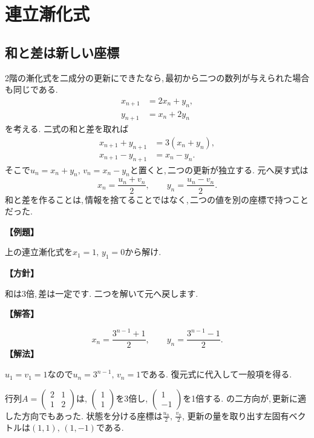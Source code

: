\section{連立漸化式}\label{節：連立漸化式}
\subsection{和と差は新しい座標}

2階の漸化式を二成分の更新にできたなら,\,最初から二つの数列が与えられた場合も同じである.
\[
 \begin{aligned}
 x_{n+1}&=2x_n+y_n,\\
 y_{n+1}&=x_n+2y_n
 \end{aligned}
\]
を考える. 二式の和と差を取れば
\[
 \begin{aligned}
 x_{n+1}+y_{n+1}&=3(x_n+y_n),\\
 x_{n+1}-y_{n+1}&=x_n-y_n.
 \end{aligned}
\]
そこで$u_n=x_n+y_n,\,v_n=x_n-y_n$と置くと,\,二つの更新が独立する.
元へ戻す式は
\[
 x_n=\frac{u_n+v_n}{2},\qquad
 y_n=\frac{u_n-v_n}{2}.
\]
和と差を作ることは,\,情報を捨てることではなく,\,二つの値を別の座標で持つことだった.

\noindent\textbf{【例題】}\par\nobreak
上の連立漸化式を$x_1=1,\,y_1=0$から解け.

\noindent\textbf{【方針】}\par\nobreak
和は3倍,\,差は一定です. 二つを解いて元へ戻します.

\noindent\textbf{【解答】}\par\nobreak
\[
 x_n=\frac{3^{n-1}+1}{2},\qquad
 y_n=\frac{3^{n-1}-1}{2}.
\]
\noindent\textbf{【解法】}\par\nobreak
$u_1=v_1=1$なので$u_n=3^{n-1},\,v_n=1$である.
復元式に代入して一般項を得る.

行列$A=\begin{pmatrix}2&1\\1&2\end{pmatrix}$は,
$\begin{pmatrix}1\\1\end{pmatrix}$を3倍し,
$\begin{pmatrix}1\\-1\end{pmatrix}$を1倍する.
の二方向が,\,更新に適した方向でもあった.
状態を分ける座標は$\frac{u_n}{2},\,\frac{v_n}{2}$,
更新の量を取り出す左固有ベクトルは$(1,1),\,(1,-1)$である.

